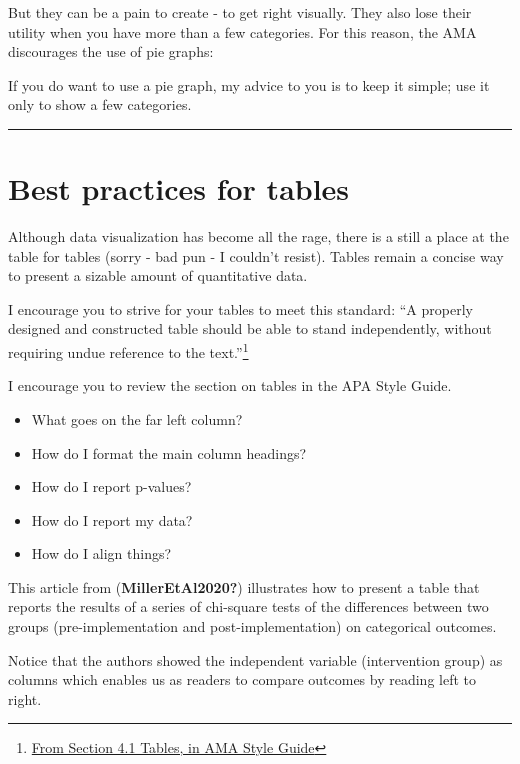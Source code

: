 \documentclass[
  letterpaper,
  DIV=11,
  numbers=noendperiod]{scrreprt}
\providecommand{\tightlist}{%
  \setlength{\itemsep}{0pt}\setlength{\parskip}{0pt}}\usepackage{longtable,booktabs,array}
\begin{document}
But they can be a pain to create - to get right visually. They also lose
their utility when you have more than a few categories. For this reason,
the AMA discourages the use of pie graphs:

If you do want to use a pie graph, my advice to you is to keep it
simple; use it only to show a few categories.

\begin{center}\rule{0.5\linewidth}{0.5pt}\end{center}

\hypertarget{best-practices-for-tables}{%
\section*{Best practices for tables}\label{best-practices-for-tables}}

Although data visualization has become all the rage, there is a still a
place at the table for tables (sorry - bad pun - I couldn't resist).
Tables remain a concise way to present a sizable amount of quantitative
data.

I encourage you to strive for your tables to meet this standard: ``A
properly designed and constructed table should be able to stand
independently, without requiring undue reference to the
text.''\footnote{\href{https://academic.oup.com/amamanualofstyle/book/27941/chapter/207563838}{From
  Section 4.1 Tables, in AMA Style Guide}}

I encourage you to review the section on tables in the APA Style Guide.

\begin{itemize}
\tightlist
\item
  What goes on the far left column?
\item
  How do I format the main column headings?
\item
  How do I report p-values?
\item
  How do I report my data?
\item
  How do I align things?
\end{itemize}

This article from (\textbf{MillerEtAl2020?}) illustrates how to present
a table that reports the results of a series of chi-square tests of the
differences between two groups (pre-implementation and
post-implementation) on categorical outcomes.

Notice that the authors showed the independent variable (intervention
group) as columns which enables us as readers to compare outcomes by
reading left to right.
\end{document}
